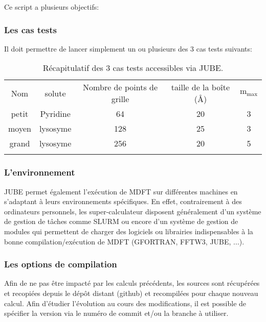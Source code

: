 Ce script a plusieurs objectifs:


\subsubsection{ Les cas tests }
Il doit permettre de lancer simplement un ou plusieurs des 3 cas tests suivants:

\begin{table}[ht]
  \begin{center}
    \begin{tabular}{c c c c c }
      \hline & \\[-1em]\hline
      Nom & solute & Nombre de points de grille & taille de la boîte (\AA) & $\mathrm{m}_\mathrm{max}$  \\
      \hline
      petit & Pyridine & 64 & 20 & 3  \\
      moyen & lysosyme & 128 & 25 & 3  \\
      grand & lysosyme & 256 & 20 & 5  \\
      \hline & \\[-1em]\hline%
    \end{tabular}
  \end{center}
  \caption{Récapitulatif des 3 cas tests accessibles via JUBE.}
  \label{tab:JUBE_bench_cases}  
\end{table}


\subsubsection{ L'environnement }
JUBE permet également l’exécution de MDFT sur différentes machines en s'adaptant à leurs environnements spécifiques. En effet, contrairement à des ordinateurs personnels, les super-calculateur disposent généralement d'un système de gestion de tâches comme SLURM ou encore d'un système de gestion de modules qui permettent de charger des logiciels ou librairies indispensables à la bonne compilation/exécution de MDFT (GFORTRAN, FFTW3, JUBE, ...).


\subsubsection{ Les options de compilation }
Afin de ne pas être impacté par les calculs précédents, les sources sont récupérées et recopiées depuis le dépôt distant (github) et recompilées pour chaque nouveau calcul. Afin d'étudier l'évolution au cours des modifications, il est possible de spécifier la version via le numéro de commit et/ou la branche à utiliser.

